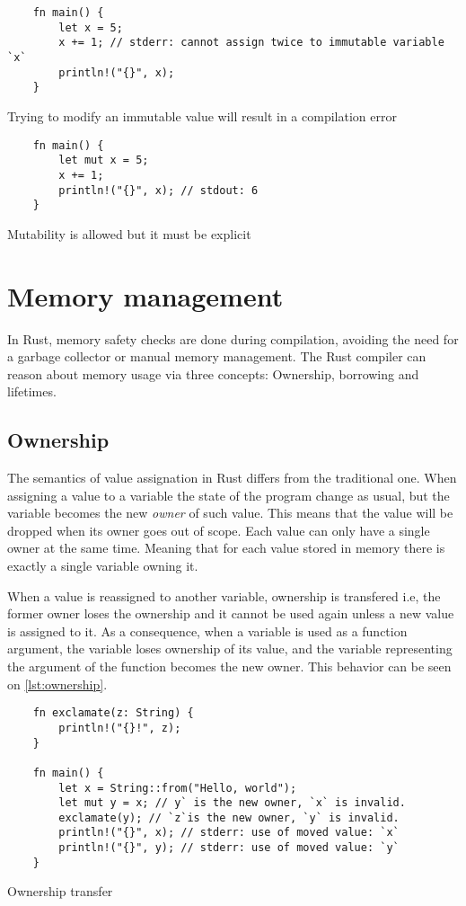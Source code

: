\begin{listing}
	\begin{verbatim}
    fn main() {
        let x = 5;
        x += 1; // stderr: cannot assign twice to immutable variable `x`
        println!("{}", x);
    }
	\end{verbatim}
  \caption{Trying to modify an immutable value will result in a compilation error}
  \label{lst:immutable}
\end{listing}

\begin{listing}
	\begin{verbatim}
    fn main() {
        let mut x = 5;
        x += 1;
        println!("{}", x); // stdout: 6 
    }
	\end{verbatim}
  \caption{Mutability is allowed but it must be explicit}
  \label{lst:mutable}
\end{listing}

\section{Memory management}
In Rust, memory safety checks are done during compilation, avoiding the need for a garbage collector or manual memory management. The Rust compiler can reason about memory usage via three concepts: Ownership, borrowing and lifetimes.

\subsection{Ownership}
The semantics of value assignation in Rust differs from the traditional one. When assigning a value to a variable the state of the program change as usual, but the variable becomes the new \textit{owner} of such value. This means that the value will be dropped when its owner goes out of scope. Each value can only have a single owner at the same time. Meaning that for each value stored in memory there is exactly a single variable owning it. 

When a value is reassigned to another variable, ownership is transfered i.e, the former owner loses the ownership and it cannot be used again unless a new value is assigned to it. As a consequence, when a variable is used as a function argument, the variable loses ownership of its value, and the variable representing the argument of the function becomes the new owner. This behavior can be seen on \ref{lst:ownership}.

\begin{listing}
	\begin{verbatim}
    fn exclamate(z: String) {
        println!("{}!", z);
    }

    fn main() {
        let x = String::from("Hello, world");
        let mut y = x; // y` is the new owner, `x` is invalid.
        exclamate(y); // `z`is the new owner, `y` is invalid.
        println!("{}", x); // stderr: use of moved value: `x`
        println!("{}", y); // stderr: use of moved value: `y`
    }
	\end{verbatim}
  \caption{Ownership transfer}
  \label{lst:ownership}
\end{listing}

